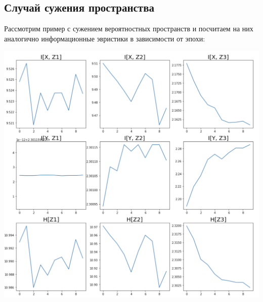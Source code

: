 \subsection{Случай сужения пространства}
Рассмотрим пример с сужением вероятностных пространств и посчитаем на них аналогично информационные эвристики в зависимости от эпохи:
\begin{center}
    \includegraphics[scale=0.5]{images/inf_comp_v1.png}
\end{center} 

